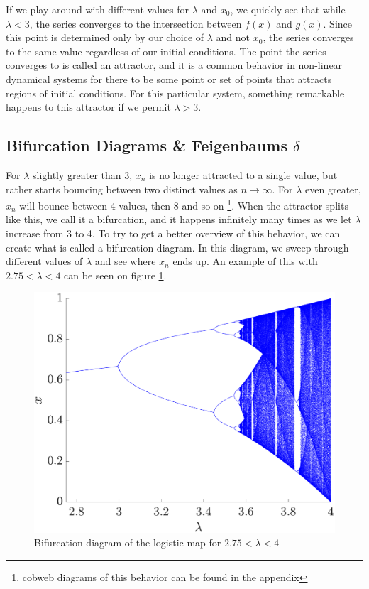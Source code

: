 \documentclass[12pt,oneside,a4paper]{article}
\numberwithin{equation}{section}
\begin{document}
{{{{If we play around with different values for $\lambda$ and 
$x_0$, we quickly see that while $\lambda<3$, the series converges to the 
intersection between $f(x)$ and $g(x)$. Since this point is determined only by our choice of $\lambda$ 
and not $x_0$, the series converges to the same value regardless of our initial conditions. The point
the series converges to is called an attractor, and it is a common behavior in non-linear dynamical
systems for there to be some point or set of points that attracts regions of initial conditions. For this particular system, something remarkable happens to this attractor if we permit $\lambda>3$.



\subsection{Bifurcation Diagrams \& Feigenbaums $\delta$}
For $\lambda$ slightly greater than 3, $x_n$ is no longer attracted to a single value, but rather starts bouncing between two distinct values as $n \rightarrow \infty$. For $\lambda$ even greater, $x_n$ will bounce between 4 values, then 8 and so on \footnote{cobweb diagrams of this behavior can be found in the appendix}. When the attractor splits like this, we call it a bifurcation, and it happens infinitely many times as we let $\lambda$ increase from 3 to 4. To try to get a better overview of this behavior, we can create what is called a bifurcation diagram. In this diagram, we sweep through different values of $\lambda$ and see where $x_n$ ends up. An example of this with $2.75<\lambda<4$ can be seen on figure \ref{bifurcation}.

\begin{figure}
	\centering
	\includegraphics[width=0.65\linewidth]{Figures/Bifurcation}
	\caption{Bifurcation diagram of the logistic map for $2.75<\lambda<4$}
	\label{bifurcation}
\end{figure}


}}}}
\end{document}
